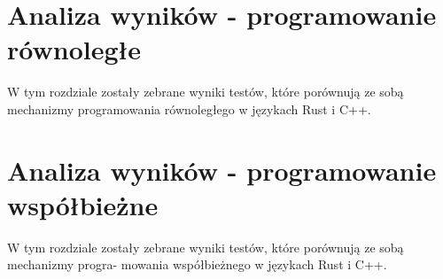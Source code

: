 \chapter{Analiza wyników - programowanie równoległe}
W tym rozdziale zostały zebrane wyniki testów, które porównują ze sobą mechanizmy programowania równoległego w językach Rust i C++.



\chapter{Analiza wyników - programowanie współbieżne}
W tym rozdziale zostały zebrane wyniki testów, które porównują ze sobą mechanizmy progra-
mowania współbieżnego w językach Rust i C++.


